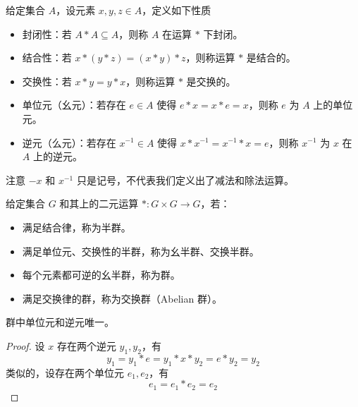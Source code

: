 \begin{definition}
	给定集合 $A$，设元素 $x, y, z \in A$，定义如下性质

	\begin{itemize}
		\item 封闭性：若 $A \ast A \subseteq A$，则称 $A$ 在运算 $\ast$ 下封闭。

		\item 结合性：若 $x \ast (y \ast z) = (x \ast y) \ast z$，则称运算 $\ast$ 是结合的。

		\item 交换性：若 $x \ast y = y \ast x$，则称运算 $\ast$ 是交换的。

		\item 单位元（幺元）：若存在 $e \in A$ 使得 $e \ast x = x \ast e = x$，则称 $e$ 为 $A$ 上的单位元。

		\item 逆元（么元）：若存在 $x^{-1} \in A$ 使得 $x \ast x^{-1} = x^{-1} \ast x = e$，则称 $x^{-1}$ 为 $x$ 在 $A$ 上的逆元。
	\end{itemize}

\end{definition}

注意 $-x$ 和 $x^{-1}$ 只是记号，不代表我们定义出了减法和除法运算。

\begin{definition}[群，半群]
	给定集合 $G$ 和其上的二元运算 $\ast: G \times G \to G$，若：

	\begin{itemize}
		\item 满足结合律，称为半群。

		\item 满足单位元、交换性的半群，称为幺半群、交换半群。

		\item 每个元素都可逆的幺半群，称为群。

		\item 满足交换律的群，称为交换群（Abelian 群）。
	\end{itemize}
\end{definition}

\begin{example}
	群中单位元和逆元唯一。
\end{example}

\begin{proof}
	设 $x$ 存在两个逆元 $y_1, y_2$，有
	\[ y_1 = y_1 \ast e = y_1 \ast x \ast y_2 = e \ast y_2 = y_2 \]
	类似的，设存在两个单位元 $e_1, e_2$，有
	\[ e_1 = e_1 \ast e_2 = e_2 \]
\end{proof}

